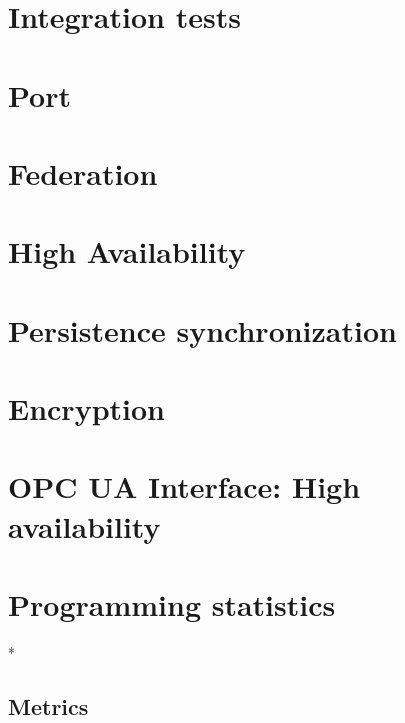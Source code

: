 
\section{Integration tests}

\section{Port}\label{sec:res:port}


\section{Federation}\label{sec:res:cluster}

\section{High Availability}\label{sec:res:ha}


\section{Persistence synchronization}\label{sec:res:psync}

\section{Encryption}\label{sec:res:security}

\section{OPC UA Interface: High availability}\label{sec:res:opc-ua}



\section{Programming statistics}

* %
\subsection{Metrics}


